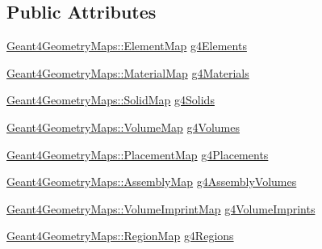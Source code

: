 \subsection*{Public Attributes}
\begin{DoxyCompactItemize}
\item 
\hyperlink{namespace_d_d4hep_1_1_simulation_1_1_geant4_geometry_maps_a175b532b796e7de3d9128c1f0e1ee406}{Geant4\+Geometry\+Maps\+::\+Element\+Map} \hyperlink{class_d_d4hep_1_1_simulation_1_1_geant4_geometry_info_a40b8d4041f5b89826971ffb9d1db9e1c}{g4\+Elements}
\item 
\hyperlink{namespace_d_d4hep_1_1_simulation_1_1_geant4_geometry_maps_a0ae377c64e684c47bd3045a9d3d8e248}{Geant4\+Geometry\+Maps\+::\+Material\+Map} \hyperlink{class_d_d4hep_1_1_simulation_1_1_geant4_geometry_info_a371057dc8aa3117cc3dfc465fd692cfb}{g4\+Materials}
\item 
\hyperlink{namespace_d_d4hep_1_1_simulation_1_1_geant4_geometry_maps_a5591dbffcd2e6432004034209abd630e}{Geant4\+Geometry\+Maps\+::\+Solid\+Map} \hyperlink{class_d_d4hep_1_1_simulation_1_1_geant4_geometry_info_ad35660bb944a3d8133ef17abeb898d0f}{g4\+Solids}
\item 
\hyperlink{namespace_d_d4hep_1_1_simulation_1_1_geant4_geometry_maps_a85199a23e6a837678c8e5d5f902fb2e2}{Geant4\+Geometry\+Maps\+::\+Volume\+Map} \hyperlink{class_d_d4hep_1_1_simulation_1_1_geant4_geometry_info_a6699981243bf97abf6c16e51a72dcabb}{g4\+Volumes}
\item 
\hyperlink{namespace_d_d4hep_1_1_simulation_1_1_geant4_geometry_maps_a587c0a02d3847f03e6427093c90e93d2}{Geant4\+Geometry\+Maps\+::\+Placement\+Map} \hyperlink{class_d_d4hep_1_1_simulation_1_1_geant4_geometry_info_aa99d9cc649a22de3dc3f05f07558951a}{g4\+Placements}
\item 
\hyperlink{namespace_d_d4hep_1_1_simulation_1_1_geant4_geometry_maps_ae1f67e315dd299b17e4ea1c58a47b312}{Geant4\+Geometry\+Maps\+::\+Assembly\+Map} \hyperlink{class_d_d4hep_1_1_simulation_1_1_geant4_geometry_info_a663f4e581a601fe42c81bd936c4d6960}{g4\+Assembly\+Volumes}
\item 
\hyperlink{namespace_d_d4hep_1_1_simulation_1_1_geant4_geometry_maps_aade714d6f596f4d83009dcc2f3968d86}{Geant4\+Geometry\+Maps\+::\+Volume\+Imprint\+Map} \hyperlink{class_d_d4hep_1_1_simulation_1_1_geant4_geometry_info_a62c7998ab4b27c040c67577a136e93e9}{g4\+Volume\+Imprints}
\item 
\hyperlink{namespace_d_d4hep_1_1_simulation_1_1_geant4_geometry_maps_afb7f77d7599fee831bfb2341123e8377}{Geant4\+Geometry\+Maps\+::\+Region\+Map} \hyperlink{class_d_d4hep_1_1_simulation_1_1_geant4_geometry_info_aee8fb6dc1279abe93e73ccf67c41d011}{g4\+Regions}

\end{DoxyCompactItemize}

